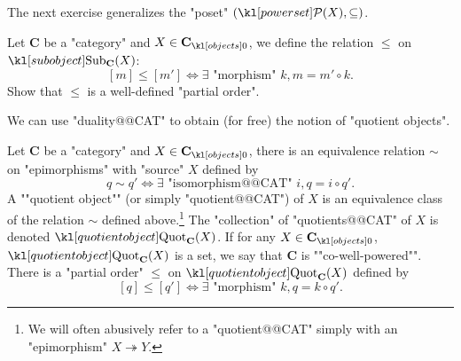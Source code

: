 \documentclass[main.tex]{subfiles}
\begin{document}
The next exercise generalizes the "poset" $(\mP(X), \subseteq)$.
\begin{exer}\label{exer:duality:posetsubobj}
	Let $\mathbf{C}$ be a "category" and $X \in \obj{\mathbf{C}}$, we define the relation $\leq$ on $\Sub_{\mathbf{C}}(X)$: 
	\[[m] \leq [m'] \Leftrightarrow \exists \text{ "morphism" } k,  m = m' \circ k.\]
	Show that $\leq$ is a well-defined "partial order".
\end{exer}
We can use "duality@@CAT" to obtain (for free) the notion of "quotient objects".
\begin{defn}[Quotients]
	Let $\mathbf{C}$ be a "category" and $X \in \obj{\mathbf{C}}$, there is an equivalence relation $\sim$ on "epimorphisms" with "source" $X$ defined by \[q \sim q' \Leftrightarrow \exists \text{ "isomorphism@@CAT" } i,  q = i \circ q'.\]
	\AP A ""quotient object"" (or simply "quotient@@CAT") of $X$ is an equivalence class of the relation $\sim$ defined above.\footnote{We will often abusively refer to a "quotient@@CAT" simply with an "epimorphism" $X \twoheadrightarrow Y$.} The "collection" of "quotients@@CAT" of $X$ is denoted $\Quot_{\mathbf{C}}(X)$. \AP If for any $X \in \obj{\mathbf{C}}$, $\Quot_{\mathbf{C}}(X)$ is a set, we say that $\mathbf{C}$ is ""co-well-powered"". There is a "partial order" $\leq$ on $\Quot_{\mathbf{C}}(X)$ defined by 
	\[[q] \leq [q'] \Leftrightarrow \exists \text{ "morphism" } k,  q = k \circ q'.\]
\end{defn}
\end{document}
